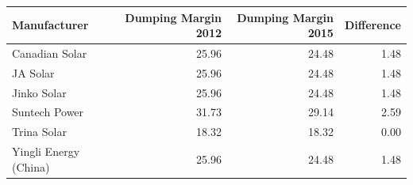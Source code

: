\begin{table}[!t]
\fontsize{12.0pt}{14.4pt}\selectfont
\begin{tabular*}{\linewidth}{@{\extracolsep{\fill}}lrrr}
\toprule
Manufacturer & Dumping Margin 2012 & Dumping Margin 2015 & Difference \\ 
\midrule\addlinespace[2.5pt]
Canadian Solar & 25.96 & 24.48 & 1.48 \\ 
JA Solar & 25.96 & 24.48 & 1.48 \\ 
Jinko Solar & 25.96 & 24.48 & 1.48 \\ 
Suntech Power & 31.73 & 29.14 & 2.59 \\ 
Trina Solar & 18.32 & 18.32 & 0.00 \\ 
Yingli Energy (China) & 25.96 & 24.48 & 1.48 \\ 
\bottomrule
\end{tabular*}
\end{table}

